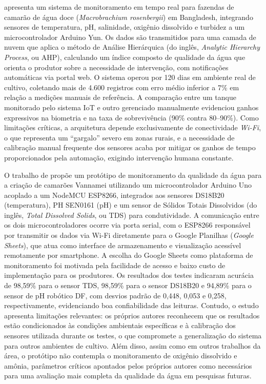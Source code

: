 \documentclass[11pt,a4paper]{article}
\begin{document}
\cite{Uddin2020} apresenta um sistema de monitoramento em tempo real para fazendas de camarão de água doce (\textit{Macrobrachium rosenbergii}) em Bangladesh, integrando sensores de temperatura, pH, salinidade, oxigênio dissolvido e turbidez a um microcontrolador Arduino Yun. Os dados são transmitidos para uma camada de nuvem que aplica o método de Análise Hierárquica (do inglês, \textit{Analytic Hierarchy Process}, ou AHP), calculando um índice composto de qualidade da água que orienta o produtor sobre a necessidade de intervenção, com notificações automáticas via portal web. O sistema operou por 120 dias em ambiente real de cultivo, coletando mais de 4.600 registros com erro médio inferior a 7\% em relação a medições manuais de referência. A comparação entre um tanque monitorado pelo sistema IoT e outro gerenciado manualmente evidenciou ganhos expressivos na biometria e na taxa de sobrevivência (90\% contra 80--90\%). Como limitações críticas, a arquitetura depende exclusivamente de conectividade \textit{Wi-Fi}, o que representa um ``gargalo'' severo em zonas rurais, e a necessidade de calibração manual frequente dos sensores acaba por mitigar os ganhos de tempo proporcionados pela automação, exigindo intervenção humana constante.

O trabalho de \cite{Arifani2024} propõe um protótipo de monitoramento da qualidade da água para a criação de camarões Vannamei utilizando um microcontrolador Arduino Uno acoplado a um NodeMCU ESP8266, integrados aos sensores DS18B20 (temperatura), PH SEN0161 (pH) e um sensor de Sólidos Totais Dissolvidos (do inglês, \textit{Total Dissolved Solids}, ou TDS) para condutividade. A comunicação entre os dois microcontroladores ocorre via porta serial, com o ESP8266 responsável por transmitir os dados via Wi-Fi diretamente para o Google Planilhas (\textit{Google Sheets}), que atua como interface de armazenamento e visualização acessível remotamente por smartphone. A escolha do Google Sheets como plataforma de monitoramento foi motivada pela facilidade de acesso e baixo custo de implementação para os produtores. Os resultados dos testes indicaram acurácia de 98,59\% para o sensor TDS, 98,59\% para o sensor DS18B20 e 94,89\% para o sensor de pH robótico DF, com desvios padrão de 0,448, 0,053 e 0,258, respectivamente, evidenciando boa confiabilidade das leituras. Contudo, o estudo apresenta limitações relevantes: os próprios autores reconhecem que os resultados estão condicionados às condições ambientais específicas e à calibração dos sensores utilizada durante os testes, o que compromete a generalização do sistema para outros ambientes de cultivo. Além disso, assim como em outros trabalhos da área, o protótipo não contempla o monitoramento de oxigênio dissolvido e amônia, parâmetros críticos apontados pelos próprios autores como necessários para uma avaliação mais completa da qualidade da água em pesquisas futuras.
\end{document}
